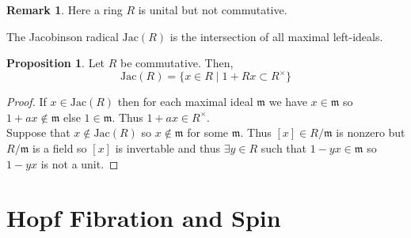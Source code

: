 \documentclass[12pt]{extarticle}
\theoremstyle{definition}
\newtheorem{proposition}[theorem]{Proposition}
\newtheorem{remark}{Remark}
\newenvironment{definition}[1][Definition:]{\begin{trivlist}
\item[\hskip \labelsep {\bfseries #1}]}{\end{trivlist}}
\newcommand{\m}{\mathfrak{m}}
\begin{document}
\newcommand{\Jac}[1]{\mathrm{Jac}\left( #1 \right)}

\begin{remark}
Here a ring $R$ is unital but not commutative.
\end{remark}


\begin{definition}
The Jacobinson radical $\Jac{R}$ is the intersection of all maximal left-ideals.
\end{definition}

\begin{proposition}
Let $R$ be commutative. Then,
\[ \Jac{R} = \{ x \in R \mid 1 + R x \subset R^\times \} \]
\end{proposition}

\begin{proof}
If $x \in \Jac{R}$ then for each maximal ideal $\m$ we have $x \in \m$ so $1 + a x \notin \m$ else $1 \in \m$. Thus $1 + ax \in R^\times$. 
\bigskip\\
Suppose that $x \notin \Jac{R}$ so $x \notin \m$ for some $\m$. Thus $[x] \in R / \m$ is nonzero but $R / \m$ is a field so $[x]$ is invertable and thus $\exists y \in R$ such that $1 - yx \in \m$ so $1 - yx$ is not a unit. 
\end{proof}

\section{Hopf Fibration and Spin}
\end{document}
